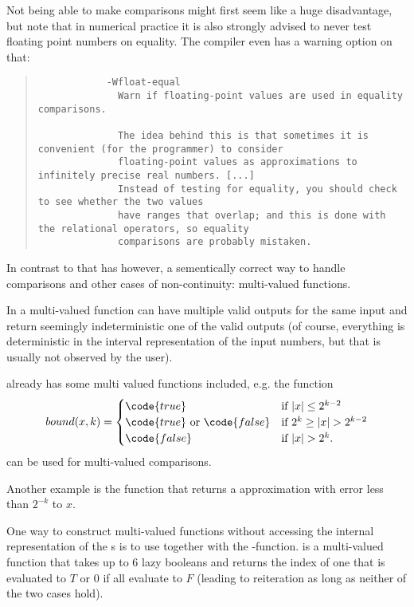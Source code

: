 		Not being able to make comparisons might first seem like a huge disadvantage, but note that in numerical practice it is also strongly advised to never test floating point numbers on equality.
		The  compiler even has a warning option on that:
		\begin{quotation}
				\noindent
		\begin{verbatim}
			-Wfloat-equal
			  Warn if floating-point values are used in equality comparisons.

			  The idea behind this is that sometimes it is convenient (for the programmer) to consider 
			  floating-point values as approximations to infinitely precise real numbers. [...]
			  Instead of testing for equality, you should check to see whether the two values 
			  have ranges that overlap; and this is done with the relational operators, so equality 
			  comparisons are probably mistaken. 
		    \end{verbatim}
		\end{quotation} 

		In contrast to that \irram has however, a sementically correct way to handle comparisons and other
		cases of non-continuity: multi-valued functions.

		In \irram a multi-valued function can have multiple valid outputs for the same input and 
		return seemingly indeterministic one of the valid outputs (of course, everything is deterministic in the 
		interval representation of the input numbers, but that is usually not observed by the user).
		
		\irram already has some multi valued functions included, e.g. the function
		\begin{equation*}
			bound(x,k) = 
			\begin{cases}
				\code{true} & \mbox{if } | x | \leq 2^{k-2} \\
				\code{true} \mbox{ or } \code{false} & \mbox{if } 2^k \geq |x| > 2^{k-2} \\
				 \code{false}  & \mbox{if } |x| > 2^k.
			\end{cases}
		\end{equation*}
		can be used for multi-valued comparisons.

		Another example is the function  that returns a  
		approximation with error less than $2^{-k}$ to $x$.	

		One way to construct multi-valued functions without accessing the internal representation of the {\real}s 
		is to use  together with the -function.
		 is a multi-valued function that takes up to 6 lazy booleans and returns the index of one 
		that is evaluated to $T$ or $0$ if all evaluate to $F$ (leading to reiteration as long as neither of the two cases hold).

